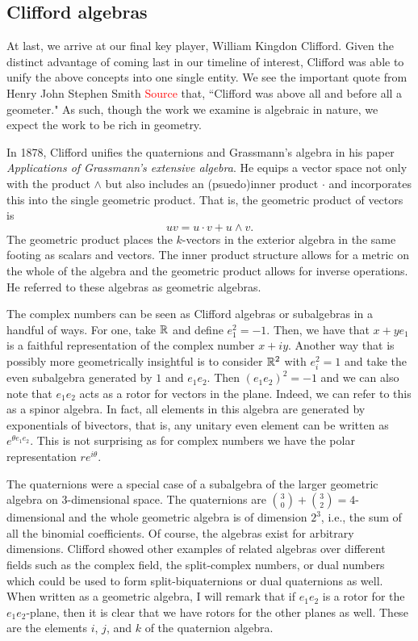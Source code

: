 \documentclass[12pt]{article}
\begin{document}
\subsection{Clifford algebras}

At last, we arrive at our final key player, William Kingdon Clifford. Given the distinct advantage of coming last in our timeline of interest, Clifford was able to unify the above concepts into one single entity. We see the important quote from Henry John Stephen Smith \textcolor{red}{Source} that, ``Clifford was above all and before all a geometer." As such, though the work we examine is algebraic in nature, we expect the work to be rich in geometry.

In 1878, Clifford unifies the quaternions and Grassmann's algebra in his paper \emph{Applications of Grassmann's extensive algebra}. He equips a vector space not only with the product $\wedge$ but also includes an (psuedo)inner product $\cdot$ and incorporates this into the single geometric product. That is, the geometric product of vectors is
\begin{equation}
\label{eq:geometric_product}
uv = u\cdot v + u \wedge v.
\end{equation}
The geometric product places the $k$-vectors in the exterior algebra in the same footing as scalars and vectors. The inner product structure allows for a metric on the whole of the algebra and the geometric product allows for inverse operations. He referred to these algebras as geometric algebras.

The complex numbers can be seen as Clifford algebras or subalgebras in a handful of ways. For one, take $\mathbb{R}$ and define $e_1^2=-1$. Then, we have that $x+ye_1$ is a faithful representation of the complex number $x+iy$. Another way that is possibly more geometrically insightful is to consider $\mathbb{R}^2$ with $e_i^2=1$ and take the even subalgebra generated by $1$ and $e_1e_2$. Then $(e_1e_2)^2=-1$ and we can also note that $e_1e_2$ acts as a rotor for vectors in the plane. Indeed, we can refer to this as a spinor algebra. In fact, all elements in this algebra are generated by exponentials of bivectors, that is, any unitary even element can be written as $e^{\theta e_1 e_2}$. This is not surprising as for complex numbers we have the polar representation $re^{i\theta}$. 

The quaternions were a special case of a subalgebra of the larger geometric algebra on 3-dimensional space. The quaternions are ${{3}\choose{0}}+ {{3}\choose{2}}=4$-dimensional and the whole geometric algebra is of dimension $2^3$, i.e., the sum of all the binomial coefficients. Of course, the algebras exist for arbitrary dimensions. Clifford showed other examples of related algebras over different fields such as the complex field, the split-complex numbers, or dual numbers which could be used to form split-biquaternions or dual quaternions as well. When written as a geometric algebra, I will remark that if $e_1 e_2$ is a rotor for the $e_1 e_2$-plane, then it is clear that we have rotors for the other planes as well. These are the elements $i$, $j$, and $k$ of the quaternion algebra.
\end{document}
